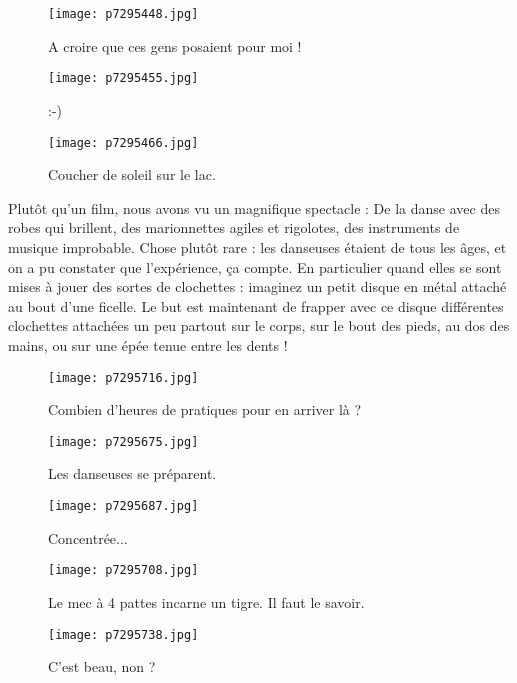 \documentclass{book}
\begin{document}
\begin{figure}[h]
\centering
\texttt{[image: p7295448.jpg]}
\caption*{A croire que ces gens posaient pour moi !}
\end{figure}


\begin{figure}[h]
\centering
\texttt{[image: p7295455.jpg]}
\caption*{:-)}
\end{figure}


\begin{figure}[h]
\centering
\texttt{[image: p7295466.jpg]}
\caption*{Coucher de soleil sur le lac.}
\end{figure}

Plutôt qu'un film, nous avons vu un magnifique spectacle : De la danse avec des robes qui brillent, des marionnettes agiles et rigolotes, des instruments de musique improbable. Chose plutôt rare : les danseuses étaient de tous les âges, et on a pu constater que l'expérience, ça compte. En particulier quand elles se sont mises à jouer des sortes de clochettes : imaginez un petit disque en métal attaché au bout d'une ficelle. Le but est maintenant de frapper avec ce disque différentes clochettes attachées un peu partout sur le corps, sur le bout des pieds, au dos des mains, ou sur une épée tenue entre les dents !


\begin{figure}[h]
\centering
\texttt{[image: p7295716.jpg]}
\caption*{Combien d'heures de pratiques pour en arriver là ?}
\end{figure}


\begin{figure}[h]
\centering
\texttt{[image: p7295675.jpg]}
\caption*{Les danseuses se préparent.}
\end{figure}


\begin{figure}[h]
\centering
\texttt{[image: p7295687.jpg]}
\caption*{Concentrée...}
\end{figure}


\begin{figure}[h]
\centering
\texttt{[image: p7295708.jpg]}
\caption*{Le mec à 4 pattes incarne un tigre. Il faut le savoir.}
\end{figure}


\begin{figure}[h]
\centering
\texttt{[image: p7295738.jpg]}
\caption*{C'est beau, non ?}
\end{figure}
\end{document}
